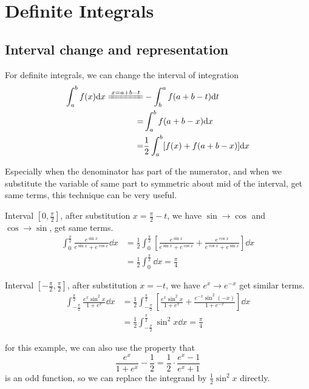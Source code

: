 \documentclass{overview}
\begin{document}
\section{Definite Integrals}
\subsection{Interval change and representation}
For definite integrals, we can change the interval of integration
\[
	\begin{aligned}
	\int_a^b f(x) \dd x \xlongequal{x = a + b - t} 
	&-\int_b^a f(a + b - t) \dd t \\
		=& \int_a^b f(a + b - x) \dd x \\
		=& \frac{1}{2} \int_a^b [f(x) + f(a + b - x)] \dd x
	\end{aligned}
\] 

Especially when the denominator has part of the numerator, and when we
substitute the variable of same part to symmetric about mid of the interval,
get same terms, this technique can be very useful.

\begin{example} 
	Interval $[0, \frac{\pi}{2}]$, after substitution $x = \frac{\pi}{2} - t$,
	we have  $\sin \to \cos$ and $\cos \to \sin$, get same terms.
	\[
		\begin{aligned}
			\int_0^{\frac{\pi}{2}} \frac{e^{\sin x}}{e^{\sin x} + e^{\cos x}} \dd x
			&= \frac{1}{2} \int_0^{\frac{\pi}{2}} \left[
				\frac{e^{\sin x}}{e^{\sin x} + e^{\cos x}} +
				\frac{e^{\cos x}}{e^{\cos x} + e^{\sin x}}
			\right] \dd x \\
			&= \frac{1}{2} \int_0^{\frac{\pi}{2}} \dd x = \frac{\pi}{4}
		\end{aligned}
	\] 
\end{example}

\begin{example}
	Interval $[-\frac{\pi}{2}, \frac{\pi}{2}]$, after substitution $x = -t$,
	we have  $e^{x} \to e^{-x}$ get similar terms.
	\[
	\begin{aligned}
		\int_{-\frac{\pi}{2}}^{\frac{\pi}{2}} \frac{e^{x} \sin^2 x}{1 + e^{x}} \dd x
		&= \frac{1}{2} \int_{-\frac{\pi}{2}}^{\frac{\pi}{2}} \left[
			\frac{e^{x} \sin^2 x}{1 + e^{x}} +
			\frac{e^{-x} \sin^2(-x)}{1 + e^{-x}}
		\right] \dd x \\
		&= \frac{1}{2} \int_{-\frac{\pi}{2}}^{\frac{\pi}{2}} \sin^2 x \dd x
		= \frac{\pi}{4}
	\end{aligned}
	\] 
\begin{remark}
	for this example, we can also use the property that
	\[
		\frac{e^{x}}{1 + e^{x}} - \frac{1}{2} = \frac{1}{2} \cdot \frac{e^{x} - 1}{e^{x} + 1}
	\] 
	is an odd function, so we can replace the integrand by $\frac{1}{2} \sin^2 x$ directly.
\end{remark}
\end{example}
\end{document}
